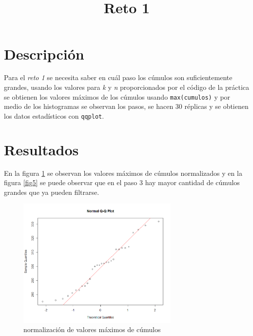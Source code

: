 \documentclass{article}
\begin{document}
\newpage

\title{Reto 1}
\section{Descripción}
Para el \textit{reto 1} se necesita saber en cuál paso los cúmulos son suficientemente grandes, usando los valores para \textit{k} y \textit{n} proporcionados por el código de la práctica \cite{elisaweb8} se obtienen los valores máximos de los cúmulos usando \texttt{max(cumulos)} y por medio de los histogramas se observan los pasos, se hacen 30 réplicas y se obtienen los datos estadísticos con \texttt{qqplot}.

\section{Resultados}
En la figura \ref{fig4} se observan los valores máximos de cúmulos normalizados y en la figura \ref{fig5} se puede observar que en el paso 3 hay mayor cantidad de cúmulos grandes que ya pueden filtrarse.

\begin{figure}[h!]
\centering\includegraphics[width=80mm]{normfreqR1.png}
\caption{normalización de valores máximos de cúmulos}
\label{fig4}
\end{figure}
\end{document}
